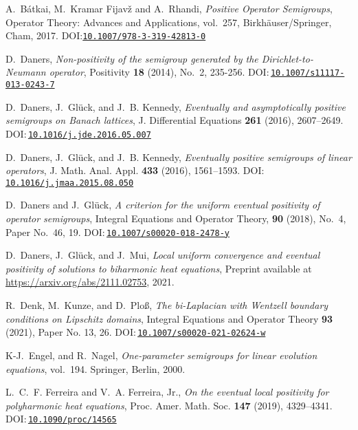 \documentclass[a4paper, reqno]{amsart}
\numberwithin{equation}{section}
\theoremstyle{plain}
\theoremstyle{definition}
\theoremstyle{remark}
\begin{document}
\begin{thebibliography}{10}
	A.~B\'{a}tkai, M.~Kramar Fijav\v{z} and A.~Rhandi, \emph{Positive Operator Semigroups}, Operator Theory: Advances and Applications, vol.~257,
	Birkh\"{a}user/Springer, Cham, 2017.
	DOI:\href{https://doi.org/10.1007/978-3-319-42813-0}{\nolinkurl{10.1007/978-3-319-42813-0}}
	
	D.~Daners, \emph{Non-positivity of the semigroup generated by the Dirichlet-to-Neumann operator}, Positivity \textbf{18} (2014), No.~2, 235-256.
	DOI:\,\href{https://doi.org/10.1007/s11117-013-0243-7}{\nolinkurl{10.1007/s11117-013-0243-7}}
	
	D.~Daners, J.~Gl\"{u}ck, and J.~B. Kennedy, \emph{Eventually and asymptotically
		positive semigroups on Banach lattices}, J. Differential Equations
	\textbf{261} (2016), 2607--2649.
	DOI:\,\href{https://doi.org/10.1016/j.jde.2016.05.007}{\nolinkurl{10.1016/j.jde.2016.05.007}}
	
	D.~Daners, J.~Gl\"{u}ck, and J.~B. Kennedy, \emph{Eventually positive
		semigroups of linear operators}, J. Math. Anal. Appl. \textbf{433} (2016),
	1561--1593.
	DOI:\,\href{https://doi.org/10.1016/j.jmaa.2015.08.050}{\nolinkurl{10.1016/j.jmaa.2015.08.050}}
	
	D.~Daners and J.~Gl\"{u}ck, \emph{A criterion for the uniform eventual positivity of operator semigroups}, Integral Equations and Operator Theory, \textbf{90} (2018),
	No.~4, Paper No.~46, 19.
	DOI:\,\href{https://doi.org/10.1007/s00020-018-2478-y}{\nolinkurl{10.1007/s00020-018-2478-y}}
	
	D.~Daners, J.~Gl\"{u}ck, and J.~Mui, \emph{Local uniform convergence and eventual positivity of solutions to biharmonic heat equations},
	Preprint available at \url{https://arxiv.org/abs/2111.02753}, 2021.
	
	R.~Denk, M.~Kunze, and D.~Plo\ss, \emph{The bi-{L}aplacian with {W}entzell
		boundary conditions on {L}ipschitz domains}, Integral Equations and Operator
	Theory \textbf{93} (2021), Paper No. 13, 26.
	DOI:\,\href{https://doi.org/10.1007/s00020-021-02624-w}{\nolinkurl{10.1007/s00020-021-02624-w}}
	
	K-J.~Engel, and R.~Nagel, \emph{One-parameter semigroups for linear evolution equations}, vol.~194. Springer, Berlin, 2000.
	
	L.~C.~F. Ferreira and V.~A. Ferreira, Jr., \emph{On the eventual local
		positivity for polyharmonic heat equations}, Proc. Amer. Math. Soc.
	\textbf{147} (2019), 4329--4341.
	DOI:\,\href{https://doi.org/10.1090/proc/14565}{\nolinkurl{10.1090/proc/14565}}
	

\end{thebibliography}
\end{document}
